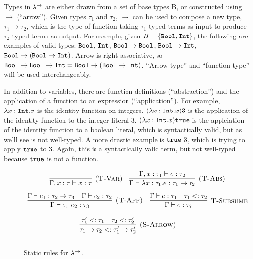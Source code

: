 Types in $\lambda^{\rightarrow}$ are either drawn from a set of base types B, or constructed using $\rightarrow$ (``arrow''). Given types $\tau_1$ and $\tau_2$, $\rightarrow$ can be used to compose a new type, $\tau_1 \rightarrow \tau_2$, which is the type of function taking $\tau_1$-typed terms as input to produce $\tau_2$-typed terms as output. For example, given $B = \{ \mathtt{Bool}, \mathtt{Int} \}$, the following are examples of valid types: $\mathtt{Bool}$, $\mathtt{Int}$, $\mathtt{Bool} \rightarrow \mathtt{Bool}$, $\mathtt{Bool} \rightarrow \mathtt{Int}$, $\mathtt{Bool} \rightarrow (\mathtt{Bool} \rightarrow \mathtt{Int})$. Arrow is right-associative, so $\mathtt{Bool} \rightarrow \mathtt{Bool} \rightarrow \mathtt{Int} = \mathtt{Bool} \rightarrow (\mathtt{Bool} \rightarrow \mathtt{Int})$. ``Arrow-type'' and ``function-type'' will be used interchangeably.

In addition to variables, there are function definitions (``abstraction'') and the application of a function to an expression (``application''). For example, $\lambda x: \mathtt{Int} . x$ is the identity function on integers. $(\lambda x: \mathtt{Int} . x) 3$ is the application of the identity function to the integer literal $3$. $(\lambda x: \mathtt{Int} . x) \mathtt{true}$ is the applciation of the identity function to a boolean literal, which is syntactically valid, but as we'll see is not well-typed. A more drastic example is $\mathtt{true}~3$, which is trying to apply $\mathtt{true}$ to $3$. Again, this is a syntactically valid term, but not well-typed because $\mathtt{true}$ is not a function.\\





\begin{figure}[h]


\[
\begin{array}{c}


\infer[\textsc{(T-Var)}]
	{\Gamma, x: \tau \vdash x: \tau}
	{}
	
~~~
	
\infer[\textsc{(T-Abs)}]
	{\Gamma \vdash \lambda x: \tau_1.e : \tau_1 \rightarrow \tau_2}
	{\Gamma, x: \tau_1 \vdash e: \tau_2} \\[2ex]
	
	
\infer[\textsc{(T-App)}]
	{\Gamma \vdash e_1~e_2: \tau_3}
	{\Gamma \vdash e_1: \tau_2 \rightarrow \tau_3 & \Gamma \vdash e_2: \tau_2}
	~~~
\infer[\textsc{T-Subsume}]
	{\Gamma \vdash e: \tau_2}
	{\Gamma \vdash e: \tau_1 & \tau_1 <: \tau_2 }

\end{array}
\]

	
\fbox{$\tau <: \tau$}

	
\[
\begin{array}{c}


\infer[\textsc{(S-Arrow)}]
	{\tau_1 \rightarrow \tau_2 <: \tau_1' \rightarrow \tau_2'}
	{\tau_1' <: \tau_1 & \tau_2 <: \tau_2'}\\[2ex]


\end{array}
\]

\vspace{-12pt}
\caption{Static rules for $\lambda^{\rightarrow}$.}
\label{This is the label.}
\end{figure}

